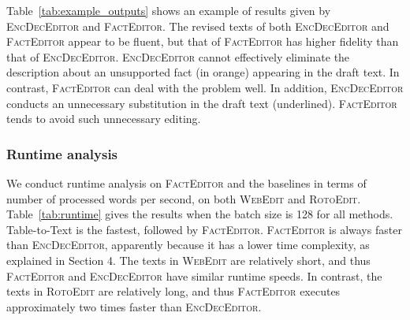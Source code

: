 \documentclass[11pt,a4paper]{article}
\newcommand{\orange}[1]{{\color[HTML]{ff7f0e}\textbf{#1}}}
\newcommand{\blue}[1]{{\color[HTML]{1f77b4}\textbf{#1}}}
\newcommand{\green}[1]{{\color[HTML]{2ca02c}\textbf{#1}}}
\begin{document}
Table~\ref{tab:example_outputs} shows an example of results
given by \textsc{EncDecEditor} and \textsc{FactEditor}. The revised texts of both \textsc{EncDecEditor} and \textsc{FactEditor} appear to be fluent, but that of \textsc{FactEditor} has higher fidelity than that of \textsc{EncDecEditor}. \textsc{EncDecEditor} cannot effectively eliminate the description about an unsupported fact (in orange) appearing in the draft text. In contrast, \textsc{FactEditor} can deal with the problem well. In addition, \textsc{EncDecEditor} conducts an unnecessary substitution in the draft text (underlined). \textsc{FactEditor} tends to avoid such unnecessary editing.

\subsubsection*{Runtime analysis}
We conduct runtime analysis on \textsc{FactEditor} and the baselines in terms of number of processed words per second, on both \textsc{WebEdit} and \textsc{RotoEdit}. Table~\ref{tab:runtime} gives the results when the batch size is 128 for all methods. Table-to-Text is the fastest, followed by \textsc{FactEditor}. \textsc{FactEditor} is always faster than \textsc{EncDecEditor}, apparently because it has a lower time complexity, as explained in Section 4. The texts in \textsc{WebEdit} are relatively short, and thus \textsc{FactEditor} and \textsc{EncDecEditor} have similar runtime speeds. In contrast, the texts in \textsc{RotoEdit} are relatively long, and thus \textsc{FactEditor} executes approximately two times faster than \textsc{EncDecEditor}.
\end{document}
